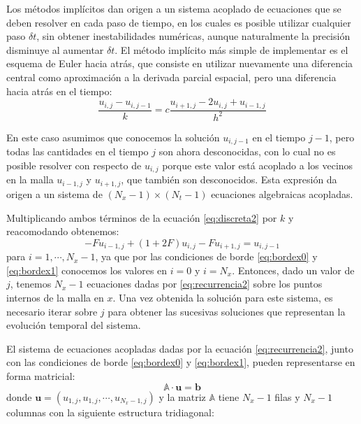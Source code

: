 Los métodos implícitos dan origen a un sistema acoplado de ecuaciones que se deben resolver en cada paso de tiempo, en los cuales es posible utilizar cualquier paso $\delta t$, sin obtener inestabilidades numéricas, aunque naturalmente la precisión disminuye al aumentar $\delta t$. El método implícito más simple de implementar es el esquema de Euler hacia atrás, que consiste en utilizar nuevamente una diferencia central como aproximación a la derivada parcial espacial, pero una diferencia hacia atrás en el tiempo:
\begin{equation}\label{eq:discreta2}
  \frac{u_{i,j} - u_{i,j-1}}{k} = c \frac{u_{i+1,j} - 2 u_{i,j} + u_{i-1, j}}{h ^2}
\end{equation} 

En este caso asumimos que conocemos la solución $u_{i, j-1}$ en el tiempo $j-1$, pero todas las cantidades en el tiempo $j$ son ahora desconocidas, con lo cual no es posible resolver con respecto de $u_{i,j}$ porque este valor está acoplado a los vecinos en la malla $u_{i-1, j}$ y $u_{i+1,j}$, que también son desconocidos. Esta expresión da origen a un sistema de $(N_x - 1) \times (N_t - 1)$ ecuaciones algebraicas acopladas.

Multiplicando ambos términos de la ecuación \eqref{eq:discreta2} por $k$ y reacomodando obtenemos:
\begin{equation} \label{eq:recurrencia2}
 -F u_{i-1, j} + (1+2F) u_{i,j} - F u_{i+1,j} = u_{i,j-1}
\end{equation} 
para $i = 1, \cdots, N_x - 1$, ya que por las condiciones de borde \eqref{eq:bordex0} y \eqref{eq:bordex1} conocemos los valores en $i=0$ y $i=N_x$. Entonces, dado un valor de $j$, tenemos $N_x-1$ ecuaciones dadas por \eqref{eq:recurrencia2} sobre los puntos internos de la malla en $x$. Una vez obtenida la solución para este sistema, es necesario iterar sobre $j$ para obtener las sucesivas soluciones que representan la evolución temporal del sistema.

El sistema de ecuaciones acopladas dadas por la ecuación \eqref{eq:recurrencia2}, junto con las condiciones de borde \eqref{eq:bordex0} y \eqref{eq:bordex1}, pueden representarse en forma matricial:
\begin{equation} \label{eq:sislin}
 \mathbb{A} \cdot \bm{u} = \bm{b}
\end{equation} 
donde $\bm{u} = (u_{1,j}, u_{1,j}, \cdots, u_{N_x-1,j})$ y la matriz $\mathbb{A}$ tiene $N_x-1$ filas y $N_x-1$ columnas con la siguiente estructura tridiagonal:

